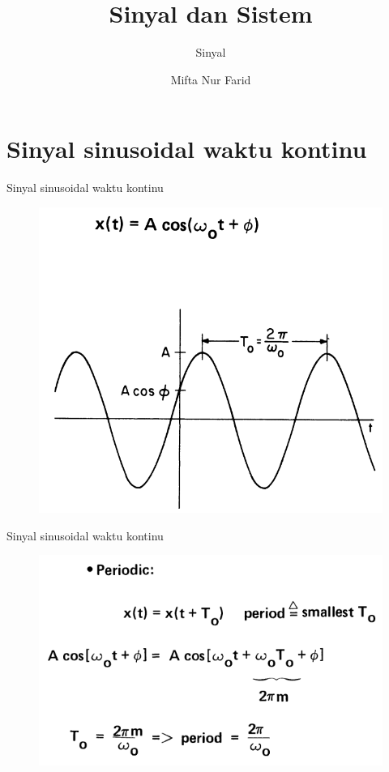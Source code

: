 \documentclass[pdflatex,compress,mathserif]{beamer}
\title{Sinyal dan Sistem}
\subtitle{Sinyal}
\author{Mifta Nur Farid}
\begin{document}
\maketitle

\section{Sinyal sinusoidal waktu kontinu}
\begin{frame}{Sinyal sinusoidal waktu kontinu}
	\begin{figure}
		\centering
		\includegraphics[height=0.8\textheight]{img/01.slide_01}
	\end{figure}
\end{frame}

\begin{frame}{Sinyal sinusoidal waktu kontinu}
	\begin{figure}
		\centering
		\includegraphics[height=0.7\textheight]{img/01.slide_02_01}
	\end{figure}
\end{frame}
\end{document}
